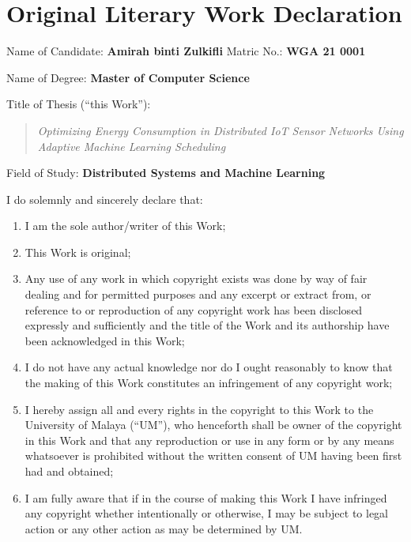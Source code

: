 \chapter*{Original Literary Work Declaration}

\noindent Name of Candidate: \textbf{Amirah binti Zulkifli} \hfill Matric No.: \textbf{WGA 21 0001}

\medskip
\noindent Name of Degree: \textbf{Master of Computer Science}

\medskip
\noindent Title of Thesis (``this Work''):

\begin{quote}
\itshape Optimizing Energy Consumption in Distributed IoT Sensor Networks Using Adaptive Machine Learning Scheduling
\end{quote}

\noindent Field of Study: \textbf{Distributed Systems and Machine Learning}

\bigskip
\noindent I do solemnly and sincerely declare that:
\begin{enumerate}[label=(\arabic*)]
  \item I am the sole author/writer of this Work;
  \item This Work is original;
  \item Any use of any work in which copyright exists was done by way of fair dealing and for permitted purposes and any excerpt or extract from, or reference to or reproduction of any copyright work has been disclosed expressly and sufficiently and the title of the Work and its authorship have been acknowledged in this Work;
  \item I do not have any actual knowledge nor do I ought reasonably to know that the making of this Work constitutes an infringement of any copyright work;
  \item I hereby assign all and every rights in the copyright to this Work to the University of Malaya (``UM''), who henceforth shall be owner of the copyright in this Work and that any reproduction or use in any form or by any means whatsoever is prohibited without the written consent of UM having been first had and obtained;
  \item I am fully aware that if in the course of making this Work I have infringed any copyright whether intentionally or otherwise, I may be subject to legal action or any other action as may be determined by UM.
\end{enumerate}

